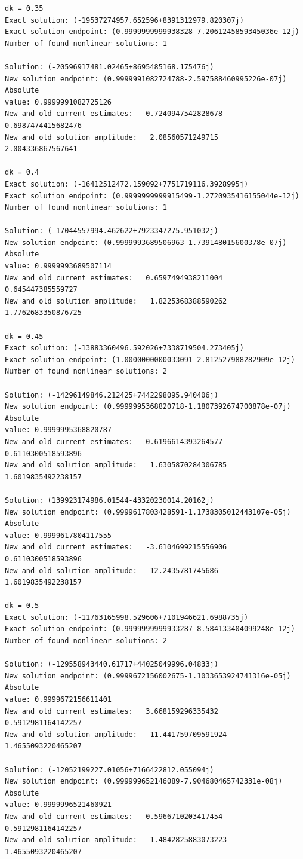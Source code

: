 \documentclass[11pt]{article}
\begin{document}
\begin{Verbatim}[commandchars=\\\{\}]
dk = 0.35
Exact solution: (-19537274957.652596+8391312979.820307j)
Exact solution endpoint: (0.9999999999938328-7.2061245859345036e-12j)
Number of found nonlinear solutions: 1

Solution: (-20596917481.02465+8695485168.175476j)
New solution endpoint: (0.9999991082724788-2.597588460995226e-07j) Absolute
value: 0.9999991082725126
New and old current estimates:   0.7240947542828678    0.6987474415682476
New and old solution amplitude:   2.08560571249715    2.004336867567641

dk = 0.4
Exact solution: (-16412512472.159092+7751719116.3928995j)
Exact solution endpoint: (0.9999999999915499-1.2720935416155044e-12j)
Number of found nonlinear solutions: 1

Solution: (-17044557994.462622+7923347275.951032j)
New solution endpoint: (0.9999993689506963-1.739148015600378e-07j) Absolute
value: 0.9999993689507114
New and old current estimates:   0.6597494938211004    0.645447385559727
New and old solution amplitude:   1.8225368388590262    1.7762683350876725

dk = 0.45
Exact solution: (-13883360496.592026+7338719504.273405j)
Exact solution endpoint: (1.0000000000033091-2.812527988282909e-12j)
Number of found nonlinear solutions: 2

Solution: (-14296149846.212425+7442298095.940406j)
New solution endpoint: (0.9999995368820718-1.1807392674700878e-07j) Absolute
value: 0.9999995368820787
New and old current estimates:   0.6196614393264577    0.6110300518593896
New and old solution amplitude:   1.6305870284306785    1.6019835492238157

Solution: (139923174986.01544-43320230014.20162j)
New solution endpoint: (0.9999617803428591-1.1738305012443107e-05j) Absolute
value: 0.9999617804117555
New and old current estimates:   -3.6104699215556906    0.6110300518593896
New and old solution amplitude:   12.2435781745686    1.6019835492238157

dk = 0.5
Exact solution: (-11763165998.529606+7101946621.6988735j)
Exact solution endpoint: (0.9999999999933287-8.584133404099248e-12j)
Number of found nonlinear solutions: 2

Solution: (-129558943440.61717+44025049996.04833j)
New solution endpoint: (0.9999672156002675-1.1033653924741316e-05j) Absolute
value: 0.9999672156611401
New and old current estimates:   3.668159296335432    0.5912981164142257
New and old solution amplitude:   11.441759709591924    1.4655093220465207

Solution: (-12052199227.01056+7166422812.055094j)
New solution endpoint: (0.999999652146089-7.904680465742331e-08j) Absolute
value: 0.9999996521460921
New and old current estimates:   0.5966710203417454    0.5912981164142257
New and old solution amplitude:   1.4842825883073223    1.4655093220465207


\end{Verbatim}
\end{document}
